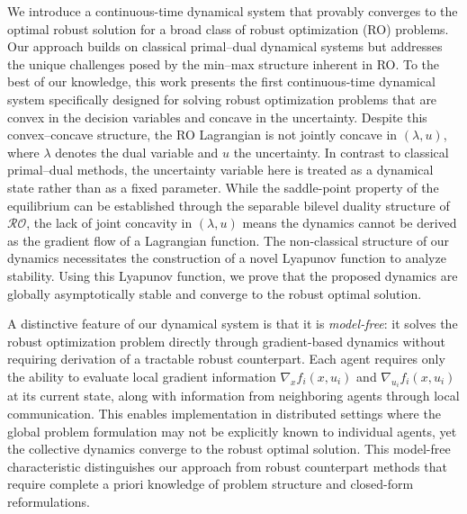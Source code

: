 \documentclass[journal,twoside,web]{ieeecolor}
\newcommand{\rev}[1]{\textcolor{revisionblue}{#1}}
\begin{document}
\rev{We introduce a continuous-time dynamical system that provably converges to the optimal robust solution for a broad class of robust optimization (RO) problems. Our approach builds on classical primal--dual dynamical systems \cite{arrow1958,feijer2010} but addresses the unique challenges posed by the min--max structure inherent in RO. To the best of our knowledge, this work presents the first continuous-time dynamical system specifically designed for solving robust optimization problems that are convex in the decision variables and concave in the uncertainty. Despite this convex--concave structure, the RO Lagrangian is not jointly concave in $(\lambda,u)$, where $\lambda$ denotes the dual variable and $u$ the uncertainty. In contrast to classical primal--dual methods, the uncertainty variable here is treated as a dynamical state rather than as a fixed parameter. While the saddle-point property of the equilibrium can be established through the separable bilevel duality structure of $\mathcal{RO}$, the lack of joint concavity in $(\lambda,u)$ means the dynamics cannot be derived as the gradient flow of a Lagrangian function. The non-classical structure of our dynamics necessitates the construction of a novel Lyapunov function to analyze stability. Using this Lyapunov function, we prove that the proposed dynamics are globally asymptotically stable and converge to the robust optimal solution.
}


\rev{A distinctive feature of our dynamical system is that it is \emph{model-free}: it solves the robust optimization problem directly through gradient-based dynamics without requiring derivation of a tractable robust counterpart. Each agent requires only the ability to evaluate local gradient information $\nabla_x f_i(x,u_i)$ and $\nabla_{u_i} f_i(x,u_i)$ at its current state, along with information from neighboring agents through local communication. This enables implementation in distributed settings where the global problem formulation may not be explicitly known to individual agents, yet the collective dynamics converge to the robust optimal solution. This model-free characteristic distinguishes our approach from robust counterpart methods that require complete a priori knowledge of problem structure and closed-form reformulations.}





\end{document}
